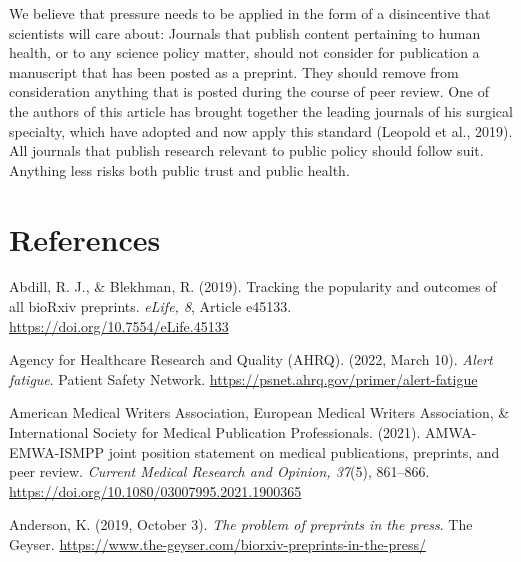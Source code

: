 \documentclass[authordate, empirical]{jote-new-article}
\begin{document}
	We believe that pressure needs to be applied in the form of a disincentive that scientists will care about: Journals that publish content pertaining to human health, or to any science policy matter, should not consider for publication a manuscript that has been posted as a preprint. They should remove from consideration anything that is posted during the course of peer review. One of the authors of this article has brought together the leading journals of his surgical specialty, which have adopted and now apply this standard (Leopold et al., 2019). All journals that publish research relevant to public policy should follow suit. Anything less risks both public trust and public health.











	\section{References}







	Abdill, R. J., \& Blekhman, R. (2019). Tracking the popularity and outcomes of all bioRxiv preprints. \emph{eLife, 8}, Article e45133. \url{https://doi.org/10.7554/eLife.45133}







	Agency for Healthcare Research and Quality (AHRQ). (2022, March 10). \emph{Alert fatigue}. Patient Safety Network. \url{https://psnet.ahrq.gov/primer/alert-fatigue}







	American Medical Writers Association, European Medical Writers Association, \& International Society for Medical Publication Professionals. (2021). AMWA-EMWA-ISMPP joint position statement on medical publications, preprints, and peer review. \emph{Current Medical Research and Opinion, 37}(5), 861--866. \url{https://doi.org/10.1080/03007995.2021.1900365}







	Anderson, K. (2019, October 3). \emph{The problem of preprints in the press}. The Geyser. \url{https://www.the-geyser.com/biorxiv-preprints-in-the-press/}
\end{document}
